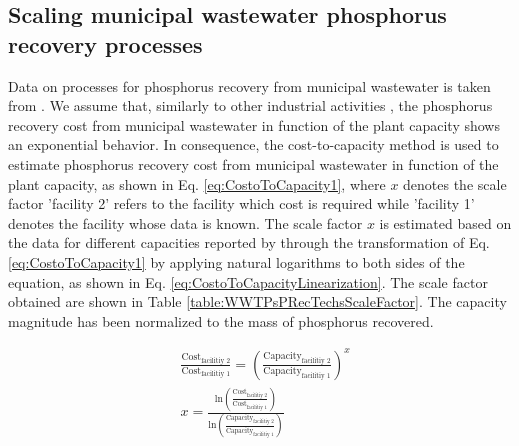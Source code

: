 \documentclass[authoryear]{elsarticle}
\begin{document}
\subsection{Scaling municipal wastewater phosphorus recovery processes}
Data on processes for phosphorus recovery from municipal wastewater is taken from \citet{egle_phosphorus_2016}. We assume that, similarly to other industrial activities \citep{dysert2005so}, the phosphorus recovery cost from municipal wastewater in function of the plant capacity shows an exponential behavior. In consequence, the cost-to-capacity method \citep{baumann2014cost} is used to estimate phosphorus recovery cost from municipal wastewater in function of the plant capacity, as shown in Eq. \ref{eq:CostoToCapacity1}, where $x$ denotes the scale factor 'facility 2' refers to the facility which cost is required while 'facility 1' denotes the facility whose data is known. The scale factor $x$ is estimated based on the data for different capacities reported by \citet{egle_phosphorus_2016} through the transformation of Eq. \ref{eq:CostoToCapacity1} by applying natural logarithms to both sides of the equation, as shown in Eq. \ref{eq:CostoToCapacityLinearization}. The scale factor obtained are shown in Table \ref{table:WWTPsPRecTechsScaleFactor}. The capacity magnitude has been normalized to the mass of phosphorus recovered.

\begin{align}
	& \frac{\text{Cost}_{\text{facilitiy 2}}}{\text{Cost}_{\text{facilitiy 1}}} = \left( \frac{\text{Capacity}_{\text{facilitiy 2}}}{\text{Capacity}_{\text{facilitiy 1}}} \right)^x \label{eq:CostoToCapacity1}\\
	& x = \frac{\text{ln} \left(\frac{\text{Cost}_{\text{facilitiy 2}}}{\text{Cost}_{\text{facilitiy 1}}} \right) }{\text{ln} \left( \frac{\text{Capacity}_{\text{facilitiy 2}}}{\text{Capacity}_{\text{facilitiy 1}}}\right) } \label{eq:CostoToCapacityLinearization}
\end{align}
\end{document}
